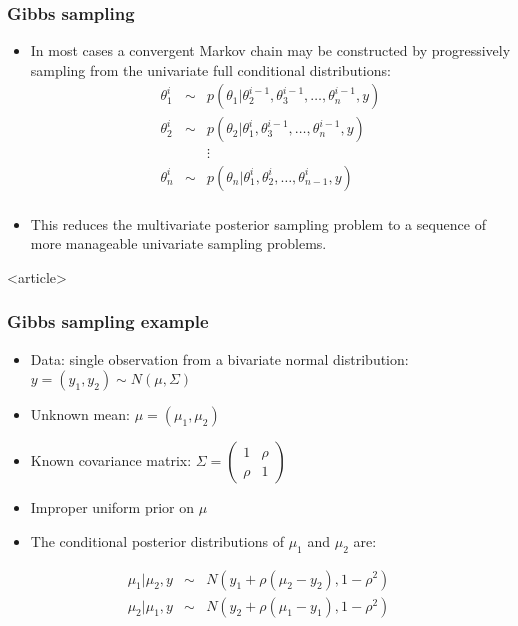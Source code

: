 \documentclass[handout]{beamer}
\begin{document}
\begin{frame}
  \frametitle{Gibbs sampling}
  
\begin{itemize}
\item In most cases a convergent Markov chain may be constructed by progressively sampling from the univariate full conditional distributions:
\begin{eqnarray*}
\theta_1^i &\sim& p\left(\theta_1|\theta_2^{i-1},\theta_3^{i-1},\ldots,\theta_n^{i-1},y\right) \\
\theta_2^i &\sim& p\left(\theta_2|\theta_1^i,\theta_3^{i-1},\ldots,\theta_n^{i-1},y\right) \\
& & \vdots \\
\theta_n^i &\sim& p\left(\theta_n|\theta_1^i,\theta_2^i,\ldots,\theta_{n-1}^i,y\right) \\
\end{eqnarray*}
\item This reduces the multivariate posterior sampling problem to a sequence of more manageable univariate sampling problems.
\end{itemize}


\end{frame}

\begin{frame}<article>
  \frametitle{Gibbs sampling example}

\begin{itemize}
\item Data: single observation from a bivariate normal distribution: $y = \left(y_1, y_2\right) \sim N\left(\mu, \Sigma\right)$
\item Unknown mean: $\mu = \left(\mu_1, \mu_2\right)$
\item Known covariance matrix: $\Sigma = \left(\begin{array}{cc} 1 & \rho \\ \rho & 1 \end{array}\right)$
\item Improper uniform prior on $\mu$
\item The conditional posterior distributions of $\mu_1$ and $\mu_2$ are:
\end{itemize}
\begin{eqnarray*}
\mu_1|\mu_2,y &\sim& N\left(y_1+\rho\left(\mu_2-y_2\right),1-\rho^2\right) \\
\mu_2|\mu_1,y &\sim& N\left(y_2+\rho\left(\mu_1-y_1\right),1-\rho^2\right) 
\end{eqnarray*}

\end{frame}
\end{document}
